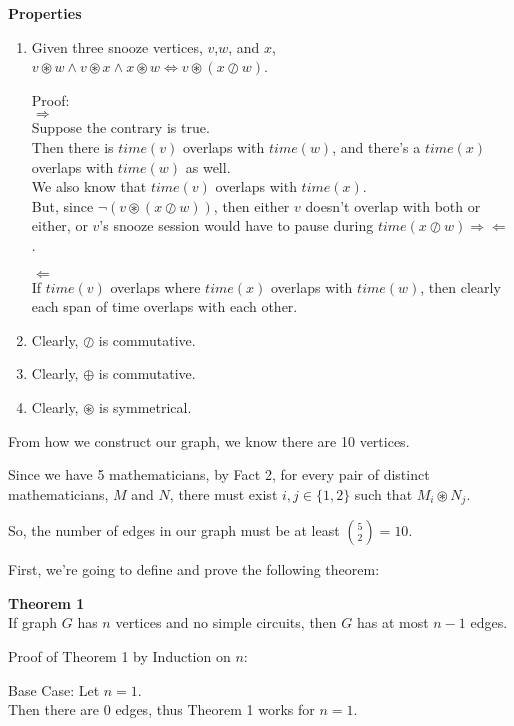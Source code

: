\documentclass[fleqn]{article}
\begin{document}
\textbf{Properties}
\begin{enumerate}
  \item Given three snooze vertices, $v$,$w$, and $x$,\\
        $v \circledast w \wedge 
         v \circledast x \wedge 
         x \circledast w \Leftrightarrow 
         v \circledast (x \oslash w)$.

        Proof:\\
        $\Rightarrow$\\
        Suppose the contrary is true.\\
        Then there is $time(v)$ overlaps with $time(w)$,
        and there's a $time(x)$ overlaps with $time(w)$ as well.\\
        We also know that $time(v)$ overlaps with $time(x)$.\\
        But, since $\neg(v \circledast (x \oslash w))$, then either
        $v$ doesn't overlap with both or either, or 
        $v$'s snooze session would have to pause during
        $time(x \oslash w) \Rightarrow \Leftarrow$.

         $\Leftarrow$\\
         If $time(v)$ overlaps where $time(x)$ overlaps with $time(w)$,
         then clearly each span of time overlaps with each  other.
  \item Clearly, $\oslash$ is commutative.
  \item Clearly, $\oplus$ is commutative.
  \item Clearly, $\circledast$ is symmetrical.
\end{enumerate}

From how we construct our graph, we know there are 10 vertices.

Since we have 5 mathematicians, by Fact 2, for every pair of distinct mathematicians, $M$ and $N$, there must exist $i,j \in \lbrace 1,2 \rbrace$ such that $M_i \circledast N_j$.

So, the number of edges in our graph must be at least ${5 \choose 2} = 10$.

First, we're going to define and prove the following theorem:

\textbf{Theorem 1}\\
If graph $G$ has $n$ vertices and no simple circuits,
then $G$ has at most $n-1$ edges.

Proof of Theorem 1 by Induction on $n$:

Base Case: Let $n = 1$.\\
Then there are 0 edges, thus Theorem 1 works for $n=1$.
\end{document}
